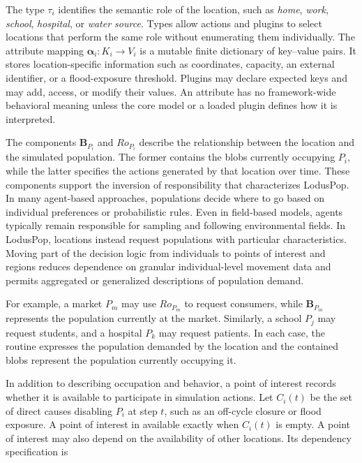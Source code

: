 The type $\tau_i$ identifies the semantic role of the location, such as \textit{home}, \textit{work}, \textit{school}, \textit{hospital}, or \textit{water source}. Types allow actions and plugins to select locations that perform the same role without enumerating them individually. 
The attribute mapping $\bm{\alpha}_i:K_i\rightarrow V_i$ is a mutable finite dictionary of key--value pairs. It stores location-specific information such as coordinates, capacity, an external identifier, or a flood-exposure threshold. Plugins may declare expected keys and may add, access, or modify their values. An attribute has no framework-wide behavioral meaning unless the core model or a loaded plugin defines how it is interpreted.

The components $\bm{B}_{P_i}$ and $Ro_{P_i}$ describe the relationship between the location and the simulated population. The former contains the blobs currently occupying $P_i$, while the latter specifies the actions generated by that location over time. 
These components support the inversion of responsibility that characterizes LodusPop. In many agent-based approaches, populations decide where to go based on individual preferences or probabilistic rules. Even in field-based models, agents typically remain responsible for sampling and following environmental fields. 
In LodusPop, locations instead request populations with particular characteristics. Moving part of the decision logic from individuals to points of interest and regions reduces dependence on granular individual-level movement data and permits aggregated or generalized descriptions of population demand.

For example, a market $P_m$ may use $Ro_{P_m}$ to request consumers, while $\bm{B}_{P_m}$ represents the population currently at the market. Similarly, a school $P_j$ may request students, and a hospital $P_k$ may request patients. In each case, the routine expresses the population demanded by the location and the contained blobs represent the population currently occupying it.

In addition to describing occupation and behavior, a point of interest records whether it is available to participate in simulation actions. Let $C_i(t)$ be the set of direct causes disabling $P_i$ at step $t$, such as an off-cycle
closure or flood exposure. A point of interest in available exactly when $C_i(t)$ is empty. A point of interest may also depend on the availability of other locations. Its dependency specification is 

